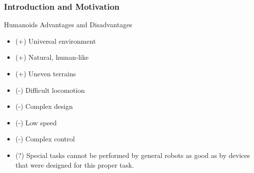 \documentclass{beamer}
\begin{document}

	\begin{frame}
		\frametitle{Introduction and Motivation}
		\begin{block}{Humanoids Advantages and Disadvantages}
			\begin{itemize}
				\item(+)
					Universal environment
				\item(+)
					Natural, human-like
				\item(+)
					Uneven terrains
				\item(-)
					Difficult locomotion
				\item(-)
					Complex design
				\item(-)
					Low speed
				\item(-)
					Complex control
				\item(?) Special tasks cannot be performed by general robots as good as by devices that were designed for this proper task.
			\end{itemize}
		\end{block}
	\end{frame}

\end{document}
